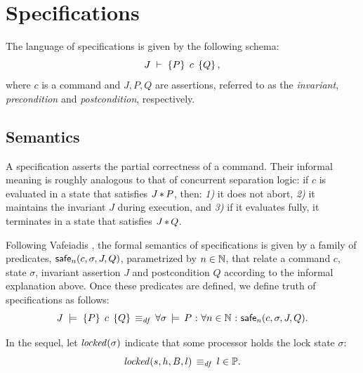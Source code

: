 \documentclass[11pt]{article}
\begin{document}
\section{Specifications}
\label{sec:specifications}

The language of specifications is given by the following schema: \[ J\;\vdash\;\left\lbrace P \right\rbrace\;c\;\left\lbrace Q \right\rbrace, \] where $c$ is a command and $J,P,Q$ are assertions, referred to as the \emph{invariant}, \emph{precondition} and \emph{postcondition}, respectively. 

\subsection{Semantics}

A specification asserts the partial correctness of a command. Their informal meaning is roughly analogous to that of concurrent separation logic: if $c$ is evaluated in a state that satisfies $J \operatorname{\ast} P$, then: \emph{1)} it does not abort, \emph{2)} it maintains the invariant $J$ during execution, and \emph{3)} if it evaluates fully, it terminates in a state that satisfies $J \operatorname{\ast} Q$. 

Following Vafeiadis \cite{V11}, the formal semantics of specifications is given by a family of predicates, $\mathsf{safe}_{n}(c,\sigma,J,Q)$, parametrized by $n \in \mathbb{N}$, that relate a command $c$, state $\sigma$, invariant assertion $J$ and postcondition $Q$ according to the informal explanation above. Once these predicates are defined, we define truth of specifications as follows: \[ J\;\models\;\left\lbrace P \right\rbrace\;c\;\left\lbrace Q \right\rbrace \operatorname{\;\equiv_{\mathit{df}}\;} \forall \sigma \,\models\, P \operatorname{\,:\,} \forall n \in \mathbb{N} \operatorname{\,:\,} \mathsf{safe}_{n}(c,\sigma,J,Q).\]

In the sequel, let $\mathit{locked}(\sigma)$ indicate that some processor holds the lock state $\sigma$: \[ \mathit{locked}(s,h,B,l) \operatorname{\;\equiv_{\mathit{df}}\;} l \in \mathbb{P}. \]
\end{document}
